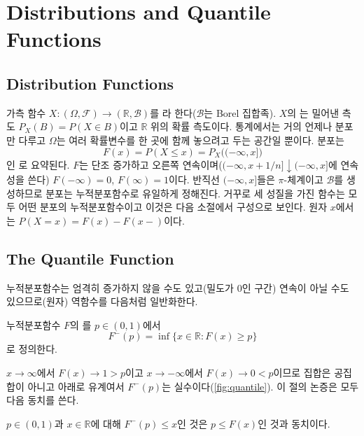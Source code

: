 \section{Distributions and Quantile Functions}
\label{sec:distributions}

\subsection{Distribution Functions}

가측 함수 $X:(\Omega,\mathcal F)\to(\mathbb R,\mathcal B)$를 라 한다($\mathcal B$는 Borel 집합족). $X$의 는 밀어낸 측도 $P_X(B)=P(X\in B)$이고 $\mathbb R$ 위의 확률 측도이다. 통계에서는 거의 언제나 분포만 다루고 $\Omega$는 여러 확률변수를 한 곳에 함께 놓으려고 두는 공간일 뿐이다. 분포는
\[
F(x)=P(X\le x)=P_X\bigl((-\infty,x]\bigr)
\]
인 로 요약된다. $F$는 단조 증가하고 오른쪽 연속이며($(-\infty,x+1/n]\downarrow(-\infty,x]$에 연속성을 쓴다) $F(-\infty)=0$, $F(\infty)=1$이다. 반직선 $(-\infty,x]$들은 $\pi$-체계이고 $\mathcal B$를 생성하므로 분포는 누적분포함수로 유일하게 정해진다. 거꾸로 세 성질을 가진 함수는 모두 어떤 분포의 누적분포함수이고 이것은 다음 소절에서 구성으로 보인다. 원자 $x$에서는 $P(X=x)=F(x)-F(x-)$이다.

\subsection{The Quantile Function}

누적분포함수는 엄격히 증가하지 않을 수도 있고(밀도가 $0$인 구간) 연속이 아닐 수도 있으므로(원자) 역함수를 다음처럼 일반화한다.

\begin{definition}
\label{def:quantile}
누적분포함수 $F$의 를 $p\in(0,1)$에서
\[
F^{-}(p)=\inf\{x\in\mathbb R:F(x)\ge p\}
\]
로 정의한다.
\end{definition}

$x\to\infty$에서 $F(x)\to1>p$이고 $x\to-\infty$에서 $F(x)\to0<p$이므로 집합은 공집합이 아니고 아래로 유계여서 $F^{-}(p)$는 실수이다(\cref{fig:quantile}). 이 절의 논증은 모두 다음 동치를 쓴다.

\begin{lemma}
\label{lem:quantile-galois}
$p\in(0,1)$과 $x\in\mathbb R$에 대해 $F^{-}(p)\le x$인 것은 $p\le F(x)$인 것과 동치이다.
\end{lemma}

